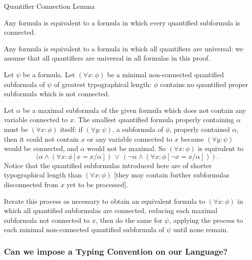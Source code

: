 \documentclass[12pt]{article}
\begin{document}
\begin{lem}\label{lem:QCL}
  Quantifier Connection Lemma

  Any formula is equivalent to a formula in which every quantified subformula is connected.\end{lem}

\Proof 

Any formula is equivalent to a formula in which all quantifiers are universal:  we assume that all quantifiers are universal in all formulas in this proof.

Let $\psi$ be a formula.  Let $(\forall x:\phi)$ be a minimal non-connected quantified subformula of $\psi$ of greatest typographical length:  $\phi$ contains no quantified proper subformula which is not connected.

Let $\alpha$ be a maximal subformula of the given formula which does not contain any variable connected to $x$.  The smallest quantified formula properly containing $\alpha$ must be $(\forall x:\phi)$ itself:  if $(\forall y:\psi)$, a subformula of $\phi$, properly contained
$\alpha$, then it could not contain $x$ or any variable connected to $x$ because $(\forall y:\psi)$ would be connected, and $\alpha$ would not be maximal.   So $(\forall x:\phi)$ is equivalent to
$$(\alpha \wedge (\forall x:\phi[x=x/\alpha])\,  \vee\,  (\neg \alpha \wedge (\forall x:\phi[\neg x=x/\alpha])).$$
Notice that the quantified subformulas introduced here are of shorter typographical length than $(\forall x:\phi)$ [they may contain further subformulas disconnected from $x$ yet to be processed].

Iterate this process as necessary to obtain an equivalent formula to $(\forall x:\phi)$  in which all quantified subformulas are connected, reducing each maximal subformula not connected to $x$, then do the same for $\psi$,
applying the process to each minimal non-connected quantified subformula of $\psi$ until none remain.



\endproof

\subsubsection*{Can we impose a Typing Convention on our Language?}
\end{document}
